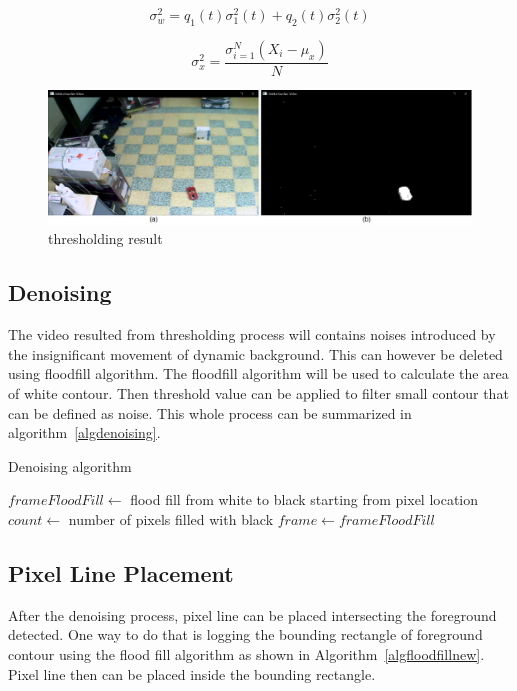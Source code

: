 \documentclass[conference]{IEEEtran}
\begin{document}
\begin{equation}
\sigma_w^2 = q_1(t) \sigma_1^2(t) + q_2(t) \sigma_2^2(t) 
\label{wcv}
\end{equation}

\begin{equation}
\sigma_x^2 = \frac{\sigma_{i=1}^N (X_i - \mu_x)}{N}
\label{cv}
\end{equation}

\begin{figure}[htbp]
\centerline{\includegraphics[width=0.9\linewidth]{thresholdres.PNG}}
\caption{thresholding result}
\label{thresres}
\end{figure}

\subsection{Denoising}
The video resulted from thresholding process will contains noises introduced by the insignificant movement of dynamic background. This can however be deleted using floodfill algorithm.
The floodfill algorithm will be used to calculate the area of white contour. Then threshold value can be applied to filter small contour that can be defined as noise. This whole process can be summarized in algorithm~\ref{algdenoising}.

\begin{algorithm}
\caption{Denoising algorithm}\label{algdenoising}
\begin{algorithmic}[1]
    \State $frameFloodFill \gets $ flood fill from white to black starting from pixel location
    \State $count \gets $ number of pixels filled with black
      \State $frame \gets frameFloodFill$
    \EndIf
  \EndIf
\EndFor
\EndProcedure
\end{algorithmic}
\end{algorithm}

\subsection{Pixel Line Placement}
After the denoising process, pixel line can be placed intersecting the foreground detected. One way to do that is logging the bounding rectangle of foreground contour using the flood fill algorithm as shown in Algorithm~\ref{algfloodfillnew}. Pixel line then can be placed inside the bounding rectangle.
\end{document}
